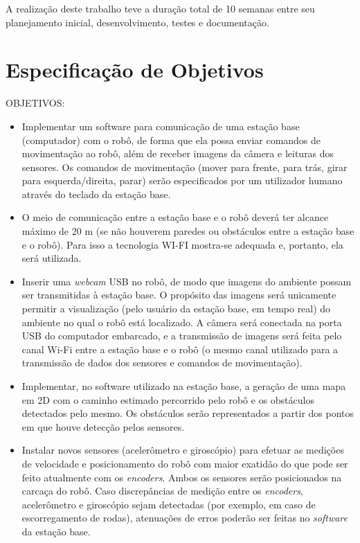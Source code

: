 A realização deste trabalho teve a duração total de 10 semanas entre seu planejamento inicial, desenvolvimento, testes e documentação.

\chapter{Especificação de Objetivos}
OBJETIVOS:

\begin{itemize}
  \item Implementar um software para comunicação de uma estação base (computador) com o robô, de forma que ela possa enviar comandos de movimentação ao robô, além de receber imagens da câmera e leituras dos sensores. Os comandos de movimentação (mover para frente, para trás, girar para esquerda/direita, parar) serão especificados por um utilizador humano através do teclado da estação base. 
  \item O meio de comunicação entre a estação base e o robô deverá ter alcance máximo de 20 m (se não houverem paredes ou obstáculos entre a estação base e o robô). Para isso a tecnologia WI-FI mostra-se adequada e, portanto, ela será utilizada.
  \item Inserir uma \textit{webcam} USB no robô, de modo que imagens do ambiente possam ser transmitidas à estação base. O propósito das imagens será unicamente permitir a visualização (pelo usuário da estação base, em tempo real) do ambiente no qual o robô está localizado. A câmera será conectada na porta USB do computador embarcado, e a transmissão de imagens será feita pelo canal Wi-Fi entre a estação base e o robô (o mesmo canal utilizado para a transmissão de dados dos sensores e comandos de movimentação).
  \item Implementar, no software utilizado na estação base, a geração de uma mapa em 2D com o caminho estimado percorrido pelo robô e os obstáculos detectados pelo mesmo. Os obstáculos serão representados a partir dos pontos em que houve detecção pelos sensores.
  \item Instalar novos sensores (acelerômetro e giroscópio) para efetuar as medições de velocidade e posicionamento do robô com maior exatidão do que pode ser feito atualmente com os \textit{encoders}. Ambos os sensores serão posicionados na carcaça do robô. Caso discrepâncias de medição entre os \textit{encoders}, acelerômetro e giroscópio sejam detectadas (por exemplo, em caso de escorregamento de rodas), atenuações de erros poderão ser feitas no \textit{software} da estação base.

\end{itemize}
